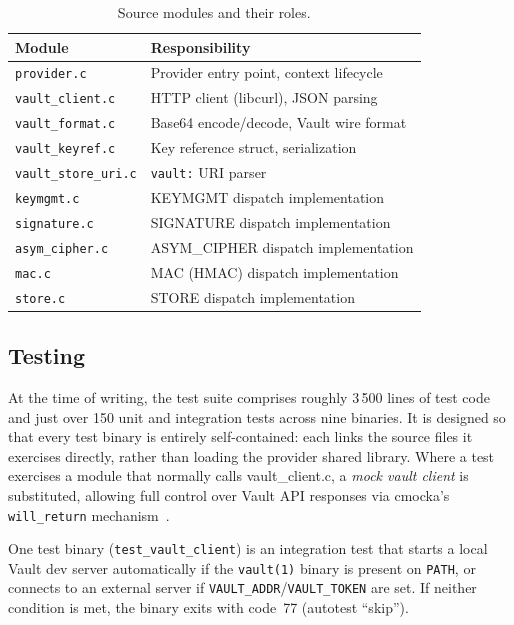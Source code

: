\documentclass[sigconf,10pt]{acmart}
\begin{document}
\begin{table}[t]
  \caption{Source modules and their roles.}
  \label{tab:modules}
  \small
  \begin{tabularx}{\columnwidth}{lX}
    \toprule
    Module & Responsibility \\
    \midrule
    \texttt{provider.c}          & Provider entry point, context lifecycle \\
    \texttt{vault\_client.c}     & HTTP client (libcurl), JSON parsing \\
    \texttt{vault\_format.c}     & Base64 encode/decode, Vault wire format \\
    \texttt{vault\_keyref.c}     & Key reference struct, serialization \\
    \texttt{vault\_store\_uri.c} & \texttt{vault:} URI parser \\
    \texttt{keymgmt.c}           & KEYMGMT dispatch implementation \\
    \texttt{signature.c}         & SIGNATURE dispatch implementation \\
    \texttt{asym\_cipher.c}      & ASYM\_CIPHER dispatch implementation \\
    \texttt{mac.c}               & MAC (HMAC) dispatch implementation \\
    \texttt{store.c}             & STORE dispatch implementation \\
    \bottomrule
  \end{tabularx}
\end{table}

\subsection{Testing}

At the time of writing, the test suite comprises roughly 3\,500 lines of
test code and just over 150 unit and integration tests across nine
binaries. It is designed so that every test binary is entirely self-contained:
each links the source files it exercises directly, rather than loading the
provider shared library.  Where a test exercises a module that normally calls
vault\_client.c, a \emph{mock vault client} is substituted, allowing
full control over Vault API responses via cmocka's \texttt{will\_return}
mechanism~\cite{cmocka}.

One test binary (\texttt{test\_vault\_client}) is an integration test that
starts a local Vault dev server automatically if the \texttt{vault(1)} binary
is present on \texttt{PATH}, or connects to an external server if
\texttt{VAULT\_ADDR}/\texttt{VAULT\_TOKEN} are set.  If neither condition is
met, the binary exits with code~77 (autotest ``skip'').
\end{document}
